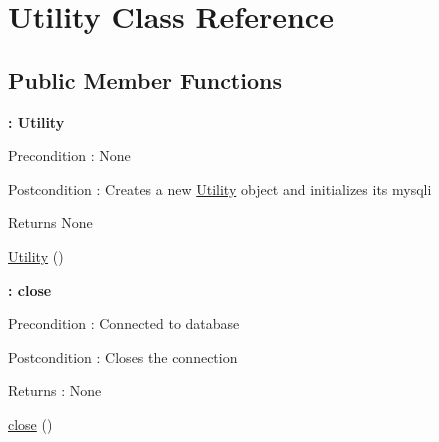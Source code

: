 \hypertarget{class_utility}{}\section{Utility Class Reference}
\label{class_utility}
\subsection*{Public Member Functions}
\begin{Indent}{\bf \+: Utility}\par
{\em \begin{DoxyPrecond}{Precondition}
\+: None 
\end{DoxyPrecond}
\begin{DoxyPostcond}{Postcondition}
\+: Creates a new \hyperlink{class_utility}{Utility} object and initializes its mysqli 
\end{DoxyPostcond}
\begin{DoxyReturn}{Returns}
None 
\end{DoxyReturn}
}\begin{DoxyCompactItemize}
\item 
\hyperlink{class_utility_a5a80b2bca9134badc1c6f7a9c76fafc3}{Utility} ()
\end{DoxyCompactItemize}
\end{Indent}
\begin{Indent}{\bf \+: close}\par
{\em \begin{DoxyPrecond}{Precondition}
\+: Connected to database 
\end{DoxyPrecond}
\begin{DoxyPostcond}{Postcondition}
\+: Closes the connection 
\end{DoxyPostcond}
\begin{DoxyReturn}{Returns}
\+: None 
\end{DoxyReturn}
}\begin{DoxyCompactItemize}
\item 
\hyperlink{class_utility_aa69c8bf1f1dcf4e72552efff1fe3e87e}{close} ()
\end{DoxyCompactItemize}
\end{Indent}

